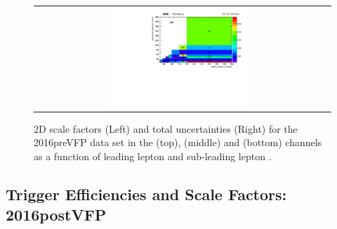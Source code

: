 {\begin{figure}[h]
\begin{center}
\begin{tabular}{cc}
      \includegraphics[width=0.50\textwidth]{fig_2016preVFP_TrigSF/h2D_lepABpt_mumu_BinErrors.pdf}\\
    \end{tabular}
    \caption{2D scale factors (Left) and total uncertainties (Right) for the 2016preVFP data set in the \emu (top), \ee (middle) and \mumu (bottom) channels as a function of leading lepton \pT and sub-leading lepton \pT.}
    \label{TrigSF_2016preVFP_4}
  \end{center}
\end{figure}

\clearpage
\subsection{Trigger Efficiencies and Scale Factors: 2016postVFP}
\label{TrigSFResults2016postVFP}

}
